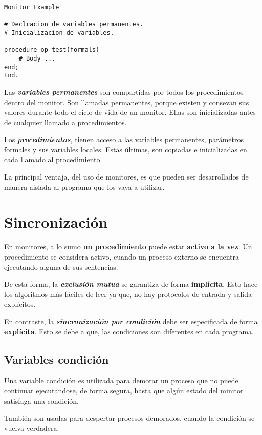 \documentclass[a4paper, 10pt]{report}
\begin{document}
\begin{lstlisting}
Monitor Example

# Declracion de variables permanentes.
# Inicializacion de variables.

procedure op_test(formals)
    # Body ...
end;
End.
\end{lstlisting}

Las \textbf{\emph{variables permanentes}} son compartidas por todos los procedimientos dentro del monitor. Son llamadas permanentes, porque existen y consevan sus valores durante todo el ciclo de vida de un monitor. Ellas son inicializadas antes de cualquier llamado a procedimientos.

Los \textbf{\emph{procedimientos}}, tienen acceso a las variables permanentes, parámetros formales y sus variables locales. Estas últimas, son copiadas e inicializadas en cada llamado al procedimiento.

La principal ventaja, del uso de monitores, es que pueden ser desarrollados de manera aislada al programa que los vaya a utilizar.

\section{Sincronización}

En monitores, a lo sumo \textbf{un procedimiento} puede estar \textbf{activo a la vez}. Un procedimiento se considera activo, cuando un proceso externo se encuentra ejecutando alguna de sus sentencias. 

De esta forma, la \textbf{\emph{exclusión mutua}} se garantiza de forma \textbf{implícita}. Esto hace los algoritmos más fáciles de leer ya que, no hay protocolos de entrada y salida explícitos.

En contraste, la \textbf{\emph{sincronización por condición}} debe ser especificada de forma \textbf{explícita}. Esto se debe a que, las condiciones son diferentes en cada programa.

\subsection{Variables condición}

Una variable condición es utilizada para demorar un proceso que no puede continuar ejecutandose, de forma segura, hasta que algún estado del minitor satisfaga una condición. 

También son usadas para despertar procesos demorados, cuando la condición se vuelva verdadera. 
\end{document}
